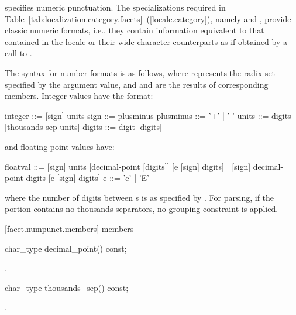 \pnum
{}
specifies numeric punctuation.
The specializations required in Table~\ref{tab:localization.category.facets}~(\ref{locale.category}), namely
and
,
provide classic
numeric formats,
i.e., they contain information equivalent to that contained in the
locale or their wide character counterparts as if obtained by
a call to
.

\pnum
The syntax for number formats is as follows, where
represents the radix set specified by the
argument value, and
and
are the results of corresponding
members.
Integer values have the format:

\begin{codeblock}
integer   ::= [sign] units
sign      ::= plusminus
plusminus ::= '+' | '-'
units     ::= digits [thousands-sep units]
digits    ::= digit [digits]
\end{codeblock}

and floating-point values have:

\begin{codeblock}
floatval ::= [sign] units [decimal-point [digits]] [e [sign] digits] |
             [sign]        decimal-point  digits   [e [sign] digits]
e        ::= 'e' | 'E'
\end{codeblock}

where the number of digits between
s
is as specified by
.
For parsing, if the
portion contains no thousands-separators, no grouping constraint
is applied.

[facet.numpunct.members]{ members}

%
\begin{itemdecl}
char_type decimal_point() const;
\end{itemdecl}

\begin{itemdescr}
\pnum
\returns
{}.
\end{itemdescr}

%
\begin{itemdecl}
char_type thousands_sep() const;
\end{itemdecl}

\begin{itemdescr}
\pnum
\returns
{}.
\end{itemdescr}

